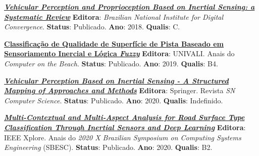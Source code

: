 \begin{small}
\begin{description}

    \item \textbf{\textit{\href{http://www.incod.ufsc.br/wp-content/uploads/2018/10/INCoD-TR-2018-07-LAPIX-E-V01.pdf}{Vehicular Perception and Proprioception Based on Inertial Sensing: a Systematic Review}}} \phantom{ } 
    \newline\textbf{Editora}: \textit{Brazilian National Institute for Digital Convergence}. 
    \newline\textbf{Status}: Publicado.
    \newline\textbf{Ano}: 2018.
    \newline\textbf{Qualis}: C.

    \item \textbf{\href{https://siaiap32.univali.br/seer/index.php/acotb/article/view/14375}{Classificação de Qualidade de Superfície de Pista Baseado em Sensoriamento Inercial e Lógica \textit{Fuzzy}}} \phantom{ } 
    \newline\textbf{Editora}: UNIVALI. Anais do \textit{Computer on the Beach}. 
    \newline\textbf{Status}: Publicado.
    \newline\textbf{Ano}: 2019.
    \newline\textbf{Qualis}: B4.
    
    \item \textbf{\textit{\href{https://link.springer.com/article/10.1007\%2Fs42979-020-00275-z}{Vehicular Perception Based on Inertial Sensing - A Structured Mapping of Approaches and Methods}}}\phantom{ } 
    \newline\textbf{Editora}: Springer. Revista \textit{SN Computer Science}. 
    \newline\textbf{Status}: Publicado.
    \newline\textbf{Ano}: 2020.
    \newline\textbf{Qualis}: Indefinido.
    
    \item \textbf{\textit{\href{https://ieeexplore.ieee.org/document/9277846}{Multi-Contextual and Multi-Aspect Analysis for Road Surface Type Classification Through Inertial Sensors and Deep Learning}}} \phantom{ } 
    \newline\textbf{Editora}: IEEE Xplore. Anais do \textit{2020 X Brazilian Symposium on Computing Systems Engineering} (SBESC). 
    \newline\textbf{Status}: Publicado.
    \newline\textbf{Ano}: 2020.
    \newline\textbf{Qualis}: B2.
    

\end{description}
\end{small}
